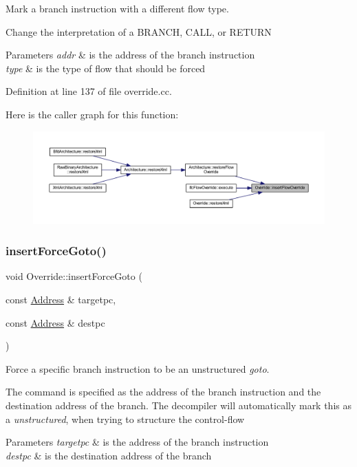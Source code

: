 Mark a branch instruction with a different flow type. 

Change the interpretation of a B\+R\+A\+N\+CH, C\+A\+LL, or R\+E\+T\+U\+RN 
\begin{DoxyParams}{Parameters}
{\em addr} & is the address of the branch instruction \\
\hline
{\em type} & is the type of flow that should be forced \\
\hline
\end{DoxyParams}


Definition at line 137 of file override.\+cc.

Here is the caller graph for this function\+:
\nopagebreak
\begin{figure}[H]
\begin{center}
\leavevmode
\includegraphics[width=350pt]{class_override_a840df7b308ba3fd78e1b16b23780f2bc_icgraph}
\end{center}
\end{figure}
\mbox{\label{class_override_a124d24114684c22e3f001c910763fae1}} 
\subsubsection{\texorpdfstring{insertForceGoto()}{insertForceGoto()}}
{\footnotesize\ttfamily void Override\+::insert\+Force\+Goto (\begin{DoxyParamCaption}\item[{const \mbox{\hyperlink{class_address}{Address}} \&}]{targetpc,  }\item[{const \mbox{\hyperlink{class_address}{Address}} \&}]{destpc }\end{DoxyParamCaption})}



Force a specific branch instruction to be an unstructured {\itshape goto}. 

The command is specified as the address of the branch instruction and the destination address of the branch. The decompiler will automatically mark this as a {\itshape unstructured}, when trying to structure the control-\/flow 
\begin{DoxyParams}{Parameters}
{\em targetpc} & is the address of the branch instruction \\
\hline
{\em destpc} & is the destination address of the branch \\
\hline
\end{DoxyParams}


